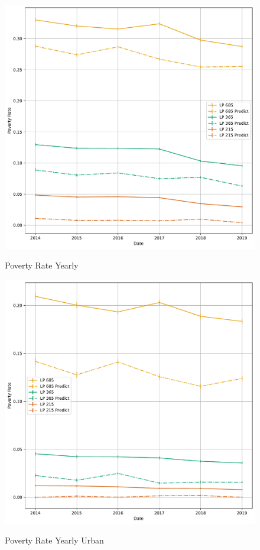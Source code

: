 \begin{figure}[H]
    \centering
    \caption{Poverty Rate Yearly}
    \includegraphics[width=\textwidth]{../figures/fig8_poverty_rate_time_series.pdf}
    \label{fig:enter-label}
\end{figure}



\begin{figure}[H]
    \centering
    \caption{Poverty Rate Yearly Urban}
    \includegraphics[width=\textwidth]{../figures/fig8a_poverty_rate_time_series_urbano.pdf}
    \label{fig:enter-label}
\end{figure}


